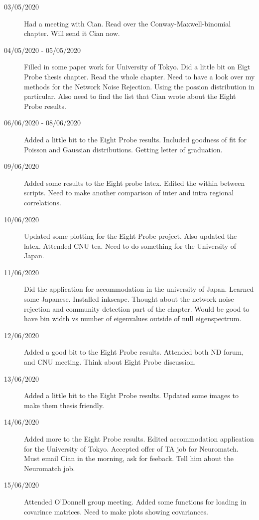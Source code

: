 \documentclass[a4paper,12pt]{article}
\theoremstyle{definition}
\begin{document}
\begin{description}
	\item[03/05/2020] Had a meeting with Cian. Read over the Conway-Maxwell-binomial chapter. Will send it Cian now.

	\item[04/05/2020 - 05/05/2020] Filled in some paper work for University of Tokyo. Did a little bit on Eigt Probe thesis chapter. Read the whole chapter. Need to have a look over my methods for the Network Noise Rejection. Using the possion distribution in particular. Also need to find the list that Cian wrote about the Eight Probe results.

	\item[06/06/2020 - 08/06/2020] Added a little bit to the Eight Probe results. Included goodness of fit for Poisson and Gaussian distributions. Getting letter of graduation.

	\item[09/06/2020] Added some results to the Eight probe latex. Edited the within between scripts. Need to make another comparison of inter and intra regional correlations.

	\item[10/06/2020] Updated some plotting for the Eight Probe project. Also updated the latex. Attended CNU tea. Need to do something for the University of Japan.

	\item[11/06/2020] Did the application for accommodation in the university of Japan. Learned some Japanese. Installed inkscape. Thought about the network noise rejection and community detection part of the chapter. Would be good to have bin width vs number of eigenvalues outside of null eigenspectrum.

	\item[12/06/2020] Added a good bit to the Eight Probe results. Attended both ND forum, and CNU meeting. Think about Eight Probe discussion.

	\item[13/06/2020] Added a little bit to the Eight Probe results. Updated some images to make them thesis friendly.

	\item[14/06/2020] Added more to the Eight Probe results. Edited accommodation application for the University of Tokyo. Accepted offer of TA job for Neuromatch. Must email Cian in the morning, ask for feeback. Tell him about the Neuromatch job.

        \item[15/06/2020] Attended O'Donnell group meeting. Added some functions for loading in covarince matrices. Need to make plots showing covariances.

\end{description}
\end{document}
